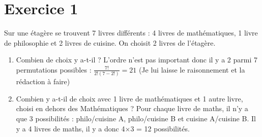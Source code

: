 \documentclass{article}
\author{}
\date{}
\title{}
\begin{document}

\section{Exercice 1}
Sur une étagère se trouvent 7 livres différents : 4 livres de mathématiques, 1 livre de philosophie et 2 livres de cuisine.\newline
On choisit 2 livres de l'étagère.
\begin{enumerate}
	\item Combien de choix y a-t-il ?\newline
	L'ordre n'est pas important donc il y a 2 parmi 7 permutations possibles : $\frac{7!}{2!(7-2!)} = 21$ (Je lui laisse le raisonnement et la rédaction à faire)
	\item Combien y a-t-il de choix avec 1 livre de mathématiques et 1 autre livre, choisi en dehors des Mathématiques ?\newline
	Pour chaque livre de maths, il n'y a que 3 possibilités : philo/cuisine A, philo/cuisine B et cuisine A/cuisine B. Il y a 4 livres de maths, il y a donc 4$\times$3 = 12 possibilités.
\end{enumerate}
\end{document}
